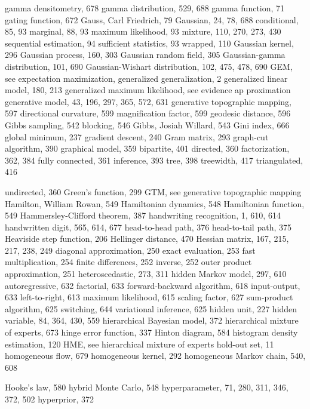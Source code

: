 \documentclass[
  10
]{article}
\begin{document}
gamma densitometry, 678 gamma distribution, 529, 688 gamma function, 71
gating function, 672 Gauss, Carl Friedrich, 79 Gaussian, 24, 78, 688
conditional, 85, 93 marginal, 88, 93 maximum likelihood, 93 mixture,
110, 270, 273, 430 sequential estimation, 94 sufficient statistics, 93
wrapped, 110 Gaussian kernel, 296 Gaussian process, 160, 303 Gaussian
random field, 305 Gaussian-gamma distribution, 101, 690 Gaussian-Wishart
distribution, 102, 475, 478, 690 GEM, see expectation maximization,
generalized generalization, 2 generalized linear model, 180, 213
generalized maximum likelihood, see evidence ap proximation generative
model, 43, 196, 297, 365, 572, 631 generative topographic mapping, 597
directional curvature, 599 magnification factor, 599 geodesic distance,
596 Gibbs sampling, 542 blocking, 546 Gibbs, Josiah Willard, 543 Gini
index, 666 global minimum, 237 gradient descent, 240 Gram matrix, 293
graph-cut algorithm, 390 graphical model, 359 bipartite, 401 directed,
360 factorization, 362, 384 fully connected, 361 inference, 393 tree,
398 treewidth, 417 triangulated, 416

undirected, 360 Green's function, 299 GTM, see generative topographic
mapping Hamilton, William Rowan, 549 Hamiltonian dynamics, 548
Hamiltonian function, 549 Hammersley-Clifford theorem, 387 handwriting
recognition, 1, 610, 614 handwritten digit, 565, 614, 677 head-to-head
path, 376 head-to-tail path, 375 Heaviside step function, 206 Hellinger
distance, 470 Hessian matrix, 167, 215, 217, 238, 249 diagonal
approximation, 250 exact evaluation, 253 fast multiplication, 254 finite
differences, 252 inverse, 252 outer product approximation, 251
heteroscedastic, 273, 311 hidden Markov model, 297, 610 autoregressive,
632 factorial, 633 forward-backward algorithm, 618 input-output, 633
left-to-right, 613 maximum likelihood, 615 scaling factor, 627
sum-product algorithm, 625 switching, 644 variational inference, 625
hidden unit, 227 hidden variable, 84, 364, 430, 559 hierarchical
Bayesian model, 372 hierarchical mixture of experts, 673 hinge error
function, 337 Hinton diagram, 584 histogram density estimation, 120 HME,
see hierarchical mixture of experts hold-out set, 11 homogeneous flow,
679 homogeneous kernel, 292 homogeneous Markov chain, 540, 608

Hooke's law, 580 hybrid Monte Carlo, 548 hyperparameter, 71, 280, 311,
346, 372, 502 hyperprior, 372
\end{document}
